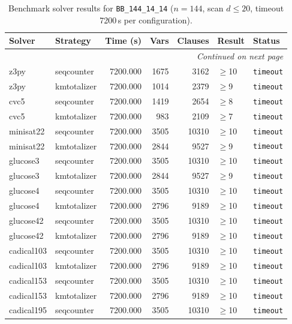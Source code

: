 \begin{longtable}{llrrrl p{}}
\caption{Benchmark solver results for \texttt{BB\_144\_14\_14} ($n=144$, scan $d \leq 20$, timeout 7200\,s per configuration).} \label{tab:bench-BB_144_14_14} \\
\toprule
Solver & Strategy & Time (s) & Vars & Clauses & Result & Status \\
\midrule
\endhead
\midrule
\multicolumn{7}{r}{\textit{Continued on next page}} \\
\midrule
\endfoot
\bottomrule
\endlastfoot
z3py & seqcounter & 7200.000 & 1675 & 3162 & $\geq$10 & \texttt{timeout} \\
z3py & kmtotalizer & 7200.000 & 1014 & 2379 & $\geq$9 & \texttt{timeout} \\
cvc5 & seqcounter & 7200.000 & 1419 & 2654 & $\geq$8 & \texttt{timeout} \\
cvc5 & kmtotalizer & 7200.000 & 983 & 2109 & $\geq$7 & \texttt{timeout} \\
minisat22 & seqcounter & 7200.000 & 3505 & 10310 & $\geq$10 & \texttt{timeout} \\
minisat22 & kmtotalizer & 7200.000 & 2844 & 9527 & $\geq$9 & \texttt{timeout} \\
glucose3 & seqcounter & 7200.000 & 3505 & 10310 & $\geq$10 & \texttt{timeout} \\
glucose3 & kmtotalizer & 7200.000 & 2844 & 9527 & $\geq$9 & \texttt{timeout} \\
glucose4 & seqcounter & 7200.000 & 3505 & 10310 & $\geq$10 & \texttt{timeout} \\
glucose4 & kmtotalizer & 7200.000 & 2796 & 9189 & $\geq$10 & \texttt{timeout} \\
glucose42 & seqcounter & 7200.000 & 3505 & 10310 & $\geq$10 & \texttt{timeout} \\
glucose42 & kmtotalizer & 7200.000 & 2796 & 9189 & $\geq$10 & \texttt{timeout} \\
cadical103 & seqcounter & 7200.000 & 3505 & 10310 & $\geq$10 & \texttt{timeout} \\
cadical103 & kmtotalizer & 7200.000 & 2796 & 9189 & $\geq$10 & \texttt{timeout} \\
cadical153 & seqcounter & 7200.000 & 3505 & 10310 & $\geq$10 & \texttt{timeout} \\
cadical153 & kmtotalizer & 7200.000 & 2796 & 9189 & $\geq$10 & \texttt{timeout} \\
cadical195 & seqcounter & 7200.000 & 3505 & 10310 & $\geq$10 & \texttt{timeout} \\

\end{longtable}
